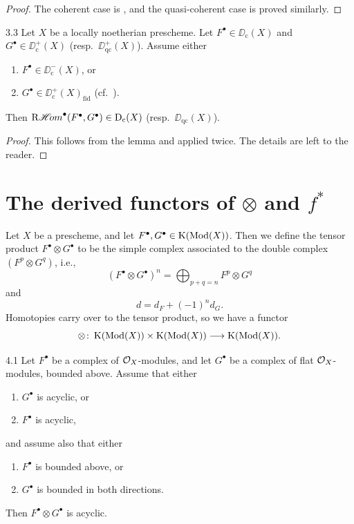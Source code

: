 \begin{proof}
The coherent case is \cite[\nopp $0_{\mathrm{III}}$, 12.3.3]{EGA}, and the quasi-coherent case is proved similarly.
\end{proof}

\begin{bookproposition}{3.3}\label{prop:2.3.3}
Let $X$ be a locally noetherian prescheme. Let $F^\bullet\in\DD_{\mathrm{c}}(X)$ and $G^\bullet\in\DD_{\mathrm{c}}^+(X)$ (resp.\ $\DD_{\mathrm{qc}}^+(X)$). Assume either
\begin{enumerate}
\item[a)] $F^\bullet\in\DD_{\mathrm{c}}^-(X)$, or
\item[b)] $G^\bullet\in\DD_{\mathrm{c}}^+(X)_{\mathrm{fid}}$ (cf.\ ).
\end{enumerate}
Then $\mathop{\mathrm{R}\mathscr{H}\!om}\nolimits^\bullet(F^\bullet,G^\bullet)\in\operatorname{D}_{\mathrm{c}}(X)$ (resp.\ $\DD_{\mathrm{qc}}(X)$).
\end{bookproposition}

\begin{proof}
This follows from the lemma and  applied twice. The details are left to the reader.
\end{proof}
\section{The derived functors of $\otimes$ and $f^*$}\label{sec:2.4}

Let $X$ be a prescheme, and let $F^\bullet,G^\bullet\in\operatorname{K}(\operatorname{Mod}(X))$. Then we define the tensor product $F^\bullet\otimes G^\bullet$ to be the simple complex associated to the double complex $(F^p\otimes G^q)$, i.e.,
\[
(F^\bullet\otimes G^\bullet)^n = \bigoplus_{p+q=n} F^p\otimes G^q
\]
and
\[
d = d_F + (-1)^n d_G.
\]
Homotopies carry over to the tensor product, so we have a functor
\[
\otimes\colon \operatorname{K}(\operatorname{Mod}(X)) \times \operatorname{K}(\operatorname{Mod}(X)) \longrightarrow \operatorname{K}(\operatorname{Mod}(X)).
\]

\begin{booklemma}{4.1}\label{lem:2.4.1}
Let $F^\bullet$ be a complex of $\mathcal{O}_X$-modules, and let $G^\bullet$ be a complex of flat $\mathcal{O}_X$-modules, bounded above. Assume that either
\begin{enumerate}
\item[a)] $G^\bullet$ is acyclic, or
\item[b)] $F^\bullet$ is acyclic,
\end{enumerate}
and assume also that either
\begin{enumerate}
\item[1)] $F^\bullet$ is bounded above, or
\item[2)] $G^\bullet$ is bounded in both directions.
\end{enumerate}
Then $F^\bullet\otimes G^\bullet$ is acyclic.
\end{booklemma}

